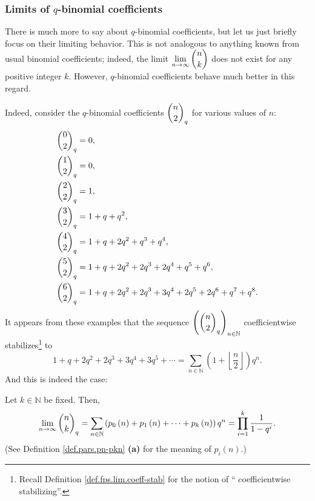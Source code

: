 \subsubsection{Limits of $q$-binomial coefficients}

There is much more to say about $q$-binomial coefficients, but let us just
briefly focus on their limiting behavior. This is not analogous to anything
known from usual binomial coefficients; indeed, the limit $\lim
\limits_{n\rightarrow\infty}\dbinom{n}{k}$ does not exist for any positive
integer $k$. However, $q$-binomial coefficients behave much better in this regard.

Indeed, consider the $q$-binomial coefficients $\dbinom{n}{2}_{q}$ for various
values of $n$:%
\begin{align*}
\dbinom{0}{2}_{q}  &  =0,\\
\dbinom{1}{2}_{q}  &  =0,\\
\dbinom{2}{2}_{q}  &  =1,\\
\dbinom{3}{2}_{q}  &  =1+q+q^{2},\\
\dbinom{4}{2}_{q}  &  =1+q+2q^{2}+q^{3}+q^{4},\\
\dbinom{5}{2}_{q}  &  =1+q+2q^{2}+2q^{3}+2q^{4}+q^{5}+q^{6},\\
\dbinom{6}{2}_{q}  &  =1+q+2q^{2}+2q^{3}+3q^{4}+2q^{5}+2q^{6}+q^{7}+q^{8}.
\end{align*}
It appears from these examples that the sequence $\left(  \dbinom{n}{2}%
_{q}\right)  _{n\in\mathbb{N}}$ coefficientwise stabilizes\footnote{Recall
Definition \ref{def.fps.lim.coeff-stab} for the notion of \textquotedblleft
coefficientwise stabilizing\textquotedblright.} to%
\[
1+q+2q^{2}+2q^{3}+3q^{4}+3q^{5}+\cdots=\sum_{n\in\mathbb{N}}\left(
1+\left\lfloor \dfrac{n}{2}\right\rfloor \right)  q^{n}.
\]
And this is indeed the case:

\begin{proposition}
\label{prop.pars.qbinom.lim1}Let $k\in\mathbb{N}$ be fixed. Then,%
\[
\lim\limits_{n\rightarrow\infty}\dbinom{n}{k}_{q}=\sum_{n\in\mathbb{N}}\left(
p_{0}\left(  n\right)  +p_{1}\left(  n\right)  +\cdots+p_{k}\left(  n\right)
\right)  q^{n}=\prod_{i=1}^{k}\dfrac{1}{1-q^{i}}.
\]
(See Definition \ref{def.pars.pn-pkn} \textbf{(a)} for the meaning of
$p_{i}\left(  n\right)  $.)
\end{proposition}

